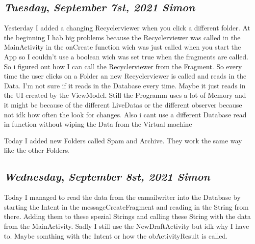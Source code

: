 \begin{center}
\section*{\month}
\end{center}


\def\day{\textit{September 7st, 2021 Simon}}
\def\weekday{\textit{Tuesday}}
\subsection*{\weekday, \day}

Yesterday I added a changing Recyclerviewer when you click a different folder.
At the beginning I hab big problems because the Recyclerviewer was called in the MainActivity
in the onCreate function wich was just called when you start the App so I couldn't use a boolean wich was set 
true when the fragments are called. So i figured out how I can call the Recyclerviewer from the Fragment. So every time 
the user clicks on a Folder an new Recyclerviewer is called and reads in the Data. I'm not sure if it reads in the Database every time. 
Maybe it just reads in the UI created by the ViewModel. Still the Programm uses a lot of Memory and it might be because of the 
different LiveDatas or the different observer because not idk how often the look for changes. Also i cant use a different Database read in function 
without wiping the Data from the Virtual machine

Today I added new Folders called Spam and Archive. They work the same way like the other Folders. 


\def\day{\textit{September 8st, 2021 Simon}}
\def\weekday{\textit{Wednesday}}
\subsection*{\weekday, \day}

Today I managed to read the data from the eamailwriter into the Database
by starting the Intent in the messageCreateFragment and reading in the String from there. Adding them to these 
spezial Strings and calling these String with the data from the MainActivity. Sadly I still use the NewDraftActivity but idk why I have to.
Maybe somthing with the Intent or how the obActivityResult is called.

